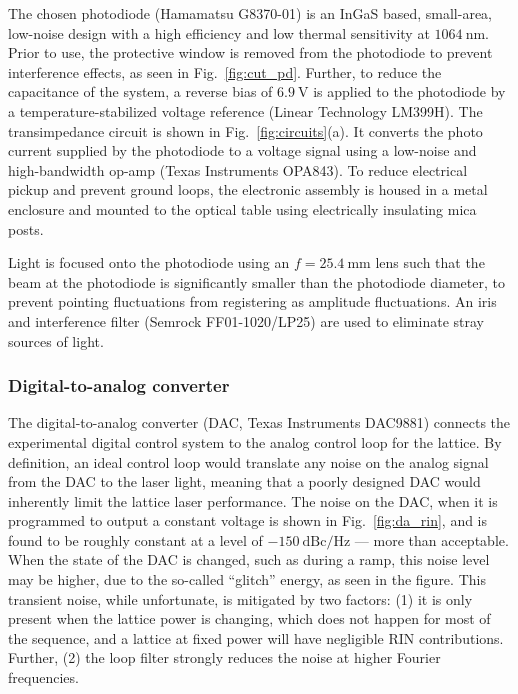 \documentclass[twocolumn,aps,pra,showpacs,preprintnumbers,bibnotes]{revtex4-1}
\newcommand\unit[2]{\ensuremath{#1~\mathrm{{#2}}}}
\begin{document}
The chosen photodiode (Hamamatsu G8370-01) is an InGaS based, small-area, low-noise design with a high efficiency and low thermal sensitivity at \unit{1064}{nm}.
Prior to use, the protective window is removed from the photodiode to prevent interference effects, as seen in Fig.~\ref{fig:cut_pd}.
Further, to reduce the capacitance of the system, a reverse bias of \unit{6.9}{V} is applied to the photodiode by a temperature-stabilized voltage reference (Linear Technology LM399H).
The transimpedance circuit is shown in Fig.~\ref{fig:circuits}(a).
It converts the photo current supplied by the photodiode to a voltage signal using a low-noise and high-bandwidth op-amp (Texas Instruments OPA843).
To reduce electrical pickup and prevent ground loops, the electronic assembly is housed in a metal enclosure and mounted to the optical table using electrically insulating mica posts.

Light is focused onto the photodiode using an $f=\unit{25.4}{mm}$ lens such that the beam at the photodiode is significantly smaller than the photodiode diameter, to prevent pointing fluctuations from registering as amplitude fluctuations.
An iris and interference filter (Semrock FF01-1020/LP25) are used to eliminate stray sources of light.


\subsubsection{Digital-to-analog converter}
The digital-to-analog converter (DAC, Texas Instruments DAC9881) connects the experimental digital control system to the analog control loop for the lattice.
By definition, an ideal control loop would translate any noise on the analog signal from the DAC to the laser light, meaning that a poorly designed DAC would inherently limit the lattice laser performance.
The noise on the DAC, when it is programmed to output a constant voltage is shown in Fig.~\ref{fig:da_rin}, and is found to be roughly constant at a level of \unit{-150}{dBc/Hz} --- more than acceptable.
When the state of the DAC is changed, such as during a ramp, this noise level may be higher, due to the so-called ``glitch'' energy, as seen in the figure.
This transient noise, while unfortunate, is mitigated by two factors: (1) it is only present when the lattice power is changing, which does not happen for most of the sequence, and a lattice at fixed power will have negligible RIN contributions. Further, (2) the loop filter strongly reduces the noise at higher Fourier frequencies.
\end{document}

